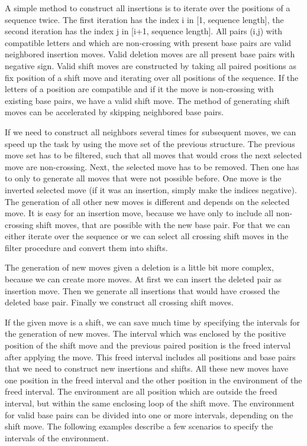A simple method to construct all insertions is to iterate over the positions of a sequence twice. The first iteration has the index i in \mbox{[}1, sequence length\mbox{]}, the second iteration has the index j in \mbox{[}i+1, sequence length\mbox{]}. All pairs (i,j) with compatible letters and which are non-\/crossing with present base pairs are valid neighbored insertion moves. Valid deletion moves are all present base pairs with negative sign. Valid shift moves are constructed by taking all paired positions as fix position of a shift move and iterating over all positions of the sequence. If the letters of a position are compatible and if it the move is non-\/crossing with existing base pairs, we have a valid shift move. The method of generating shift moves can be accelerated by skipping neighbored base pairs.

If we need to construct all neighbors several times for subsequent moves, we can speed up the task by using the move set of the previous structure. The previous move set has to be filtered, such that all moves that would cross the next selected move are non-\/crossing. Next, the selected move has to be removed. Then one has to only to generate all moves that were not possible before. One move is the inverted selected move (if it was an insertion, simply make the indices negative). The generation of all other new moves is different and depends on the selected move. It is easy for an insertion move, because we have only to include all non-\/crossing shift moves, that are possible with the new base pair. For that we can either iterate over the sequence or we can select all crossing shift moves in the filter procedure and convert them into shifts.

The generation of new moves given a deletion is a little bit more complex, because we can create more moves. At first we can insert the deleted pair as insertion move. Then we generate all insertions that would have crossed the deleted base pair. Finally we construct all crossing shift moves.

If the given move is a shift, we can save much time by specifying the intervals for the generation of new moves. The interval which was enclosed by the positive position of the shift move and the previous paired position is the freed interval after applying the move. This freed interval includes all positions and base pairs that we need to construct new insertions and shifts. All these new moves have one position in the freed interval and the other position in the environment of the freed interval. The environment are all position which are outside the freed interval, but within the same enclosing loop of the shift move. The environment for valid base pairs can be divided into one or more intervals, depending on the shift move. The following examples describe a few scenarios to specify the intervals of the environment.

